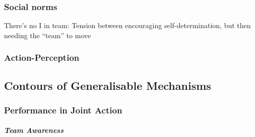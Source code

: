     \subsubsection{Social norms}

    There's no I in team:
    Tension between encouraging self-determination, but then needing the ``team'' to move







    \subsubsection{Action-Perception}







  \subsection{Contours of Generalisable Mechanisms}

    \subsubsection{Performance in Joint Action}


          \subparagraph{Team Awareness}

